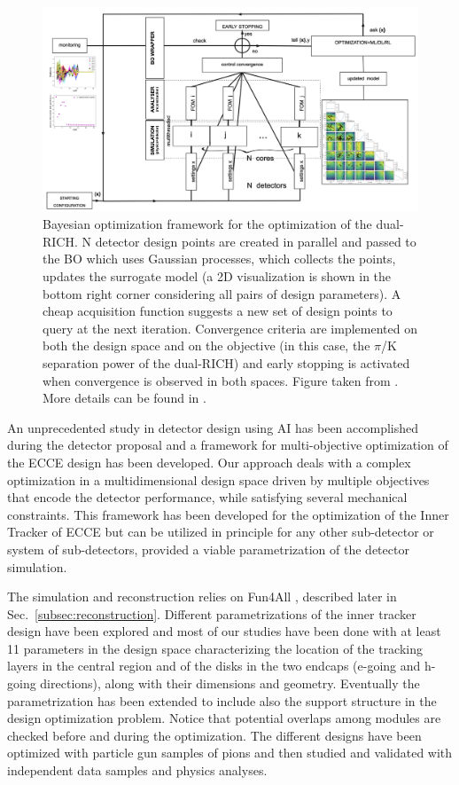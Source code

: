 \begin{figure}[!]
    \centering
    \includegraphics[scale = 0.21]{figs/dRICH_BO_scheme.png}
    \caption{
    Bayesian optimization framework for the optimization of the dual-RICH. N detector design points are created in parallel and passed to the BO which uses Gaussian processes, which collects the points, updates the surrogate model (a 2D visualization is shown in the bottom right corner considering all pairs of design parameters). A cheap acquisition function suggests a new set of design points to query at the next iteration. Convergence criteria are implemented on both the design space and on the objective (in this case, the $\pi$/K separation power of the dual-RICH) and early stopping is activated when convergence is observed in both spaces. Figure taken from \cite{fanelli_jluo2021}. More details can be found in \cite{cisbani2020ai}.   
    }
    \label{fig:dRICH_BO_scheme}
\end{figure}

An unprecedented study in detector design using AI has been accomplished during the detector proposal and a framework for multi-objective optimization of the ECCE design has been developed. 
Our approach deals with a complex optimization in a multidimensional design space driven by multiple objectives that encode the detector performance, while satisfying several mechanical constraints. 
This framework has been developed for the optimization of the Inner Tracker of ECCE but can be utilized in principle for any other sub-detector or system of sub-detectors, provided a viable parametrization of the detector simulation. 

The simulation and reconstruction relies on Fun4All \cite{fun4allGithub}, described later in Sec.~\ref{subsec:reconstruction}. 
Different parametrizations of the inner tracker design have been explored and most of our studies have been done with at least 11 parameters in the design space characterizing the location of the tracking layers in the central region and of the disks in the two endcaps (e-going and h-going directions), along with their dimensions and geometry. 
Eventually the parametrization has been extended to include also the support structure in the design optimization problem.   
Notice that potential overlaps among modules are checked before and during the optimization. 
The different designs have been optimized with particle gun samples of pions and then studied and validated with independent data samples and physics analyses.  

